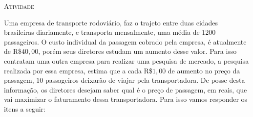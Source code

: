 \documentclass[10 pt,usenames,dvipsnames, oneside]{article}
\begin{document}
\bigskip
\begin{center}
{\large \scshape Atividade}
\end{center}
\fi

Uma empresa de transporte rodoviário, faz o trajeto entre duas cidades brasileiras diariamente, e transporta mensalmente, uma média de \(1200\) passageiros. O custo individual da passagem cobrado pela empresa, é atualmente de R\$$40,00$, porém seus diretores estudam um aumento desse valor. Para isso contratam uma outra empresa para realizar uma pesquisa de mercado, a pesquisa realizada por essa empresa, estima que a cada R\$$1,00$ de aumento no preço da passagem, \(10\) passageiros deixarão de viajar pela transportadora. De posse desta informação, os diretores desejam saber qual é o preço de passagem, em reais, que vai maximizar o faturamento dessa transportadora. Para isso vamos responder os itens a seguir:
\end{document}
